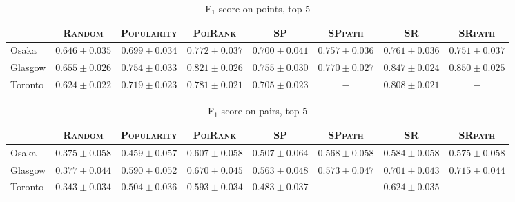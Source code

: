 \begin{table*}[!h]
\caption{F$_1$ score on points, top-5}
\centering
\small
\setlength{\tabcolsep}{4pt} %
\begin{tabular}{l|cc|cc|ccc} \hline
 & \textsc{Random} & \textsc{Popularity} & \textsc{PoiRank} & \textsc{SP} & \textsc{SPpath} & \textsc{SR} & \textsc{SRpath} \\ \hline
Osaka & $0.646\pm0.035$ & $0.699\pm0.034$ & $\mathbf{0.772\pm0.037}$ & $0.700\pm0.041$ & $0.757\pm0.036$ & $\mathit{0.761\pm0.036}$ & $0.751\pm0.037$ \\
Glasgow & $0.655\pm0.026$ & $0.754\pm0.033$ & $0.821\pm0.026$ & $0.755\pm0.030$ & $0.770\pm0.027$ & $\mathit{0.847\pm0.024}$ & $\mathbf{0.850\pm0.025}$ \\
Toronto & $0.624\pm0.022$ & $0.719\pm0.023$ & $\mathit{0.781\pm0.021}$ & $0.705\pm0.023$ & $-$ & $\mathbf{0.808\pm0.021}$ & $-$ \\
\hline
\end{tabular}
\end{table*}

\begin{table*}[!h]
\caption{F$_1$ score on pairs, top-5}
\centering
\small
\setlength{\tabcolsep}{4pt} %
\begin{tabular}{l|cc|cc|ccc} \hline
 & \textsc{Random} & \textsc{Popularity} & \textsc{PoiRank} & \textsc{SP} & \textsc{SPpath} & \textsc{SR} & \textsc{SRpath} \\ \hline
Osaka & $0.375\pm0.058$ & $0.459\pm0.057$ & $\mathbf{0.607\pm0.058}$ & $0.507\pm0.064$ & $0.568\pm0.058$ & $\mathit{0.584\pm0.058}$ & $0.575\pm0.058$ \\
Glasgow & $0.377\pm0.044$ & $0.590\pm0.052$ & $0.670\pm0.045$ & $0.563\pm0.048$ & $0.573\pm0.047$ & $\mathit{0.701\pm0.043}$ & $\mathbf{0.715\pm0.044}$ \\
Toronto & $0.343\pm0.034$ & $0.504\pm0.036$ & $\mathit{0.593\pm0.034}$ & $0.483\pm0.037$ & $-$ & $\mathbf{0.624\pm0.035}$ & $-$ \\
\hline
\end{tabular}
\end{table*}

